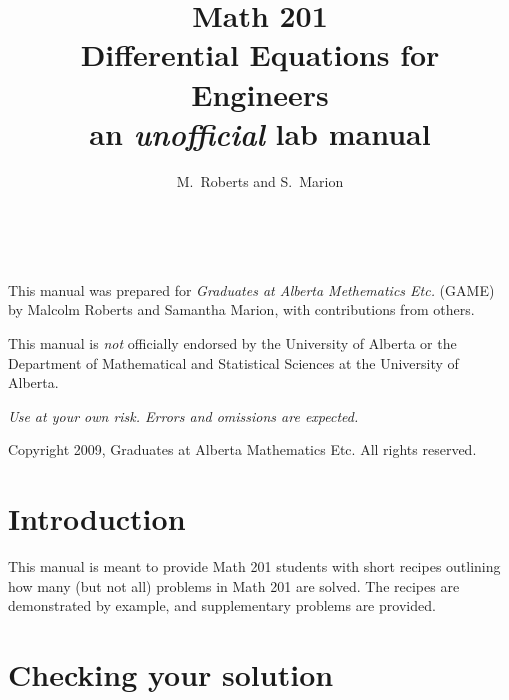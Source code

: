 \documentclass{book}
\begin{document}
\pagestyle{empty}
\title{Math 201 \\ Differential Equations for Engineers \\an
  \emph{unofficial} lab manual}
\author{M.\ Roberts and S.\ Marion}

\maketitle

\newpage\
\vspace{5in}

This manual was prepared for \emph{Graduates at Alberta Methematics
  Etc.} (GAME) by Malcolm Roberts and Samantha Marion, with
contributions from others.  \vspace{0.5in}

This manual is \emph{not} officially endorsed by the University of
Alberta or the Department of Mathematical and Statistical Sciences at
the University of Alberta.
\vspace{0.5in}

\emph{Use at your own risk.  Errors and omissions are expected.}
\vspace{0.5in}

Copyright 2009, Graduates at Alberta Mathematics Etc.  All rights
reserved.

\newpage
\tableofcontents

\newpage
\pagestyle{plain}

\section*{Introduction}

This manual is meant to provide Math 201 students with short recipes
outlining how many (but not all) problems in Math 201 are solved.  The
recipes are demonstrated by example, and supplementary problems are
provided.

\section*{Checking your solution}
\end{document}
